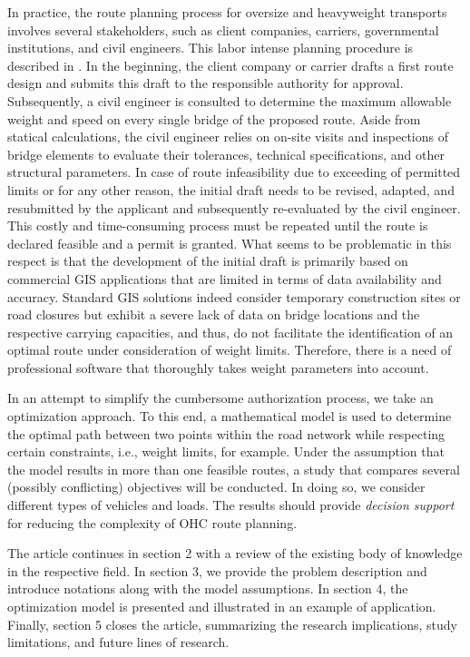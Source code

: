 \par In practice, the route planning process for oversize and heavyweight transports involves several stakeholders, such as client companies, carriers, governmental institutions, and civil engineers.
This labor intense planning procedure is described in \cite{Osegueda.1999}. In the beginning, the client company or carrier drafts a first route design and submits this draft to the responsible authority for approval.
Subsequently, a civil engineer is consulted to determine the maximum allowable weight and speed on every single bridge of the proposed route.
Aside from statical calculations, the civil engineer relies on on-site visits and inspections of bridge elements to evaluate their tolerances, technical specifications, and other structural parameters.
In case of route infeasibility due to exceeding of permitted limits or for any other reason, the initial draft needs to be revised, adapted, and resubmitted by the applicant and subsequently re-evaluated by the civil engineer.
This costly and time-consuming process must be repeated until the route is declared feasible and a permit is granted.
What seems to be problematic in this respect is that the development of the initial draft is primarily based on commercial GIS applications that are limited in terms of data availability and accuracy.
Standard GIS solutions indeed consider temporary construction sites or road closures but exhibit a severe lack of data on bridge locations and the respective carrying capacities, and thus, do not facilitate the identification of an optimal route under consideration of weight limits.
Therefore, there is a need of professional software that thoroughly takes weight parameters into account.
\par In an attempt to simplify the cumbersome authorization process, we take an optimization approach.
To this end, a mathematical model is used to determine the optimal path between two points within the road network while respecting certain constraints, i.e., weight limits, for example.
Under the assumption that the model results in more than one feasible routes, a study that compares several (possibly conflicting) objectives will be conducted.
In doing so, we consider different types of vehicles and loads. The results should provide \textit{decision support} for reducing the complexity of OHC route planning. 
\par
The article continues in section 2 with a review of the existing body of knowledge in the respective field.
In section 3, we provide the problem description and introduce notations along with the model assumptions. In section 4, the optimization model is presented and illustrated in an example of application.
Finally, section 5 closes the article, summarizing the research implications, study limitations, and future lines of research.
